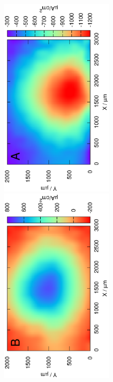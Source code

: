 \begin{figure}
\centering
\includegraphics[width=0.5\textwidth, angle=-90]{img/mérések/Fe_h100.eps}
\includegraphics[width=0.5\textwidth, angle=-90]{img/mérések/Zn_h100.eps}

\end{figure}
